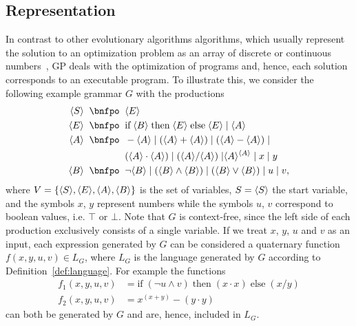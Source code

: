 \subsection{Representation}\label{sec:gggp-representation}
In contrast to other evolutionary algorithms algorithms, which usually represent the solution to an optimization problem as an array of discrete or continuous numbers~\cite{back1997handbook}, GP deals with the optimization of programs and, hence, each solution corresponds to an executable program.
To illustrate this, we consider the following example grammar $G$ with the productions
\begin{equation}
	\begin{split}
		\ps S \; \; \bnfpo & \; \; \ps E \\
		\ps E \; \; \bnfpo & \; \; \text{if} \; \ps B \; \text{then} \; \ps E \; \text{else} \; \ps E \; | \; \ps A \\
		\ps A \; \; \bnfpo & \; \; -\ps A \; | \; (\ps A + \ps A) \; | \; (\ps A - \ps A) \; | \\
		 & \; \; (\ps A \cdot \ps A) \; | \; (\ps A / \ps A) \; | \ps{A}^{\ps{A}} \; | \; x \; | \; y \\  
		\ps B \; \; \bnfpo & \; \;  \neg \ps B \; | \; (\ps B \wedge \ps B) \; | \; (\ps B \vee \ps B) \; | \; u \; | \; v,
	\end{split}
\label{eq:gp-example-grammar}
\end{equation}
where $V = \{\langle S \rangle, \langle E \rangle, \langle A \rangle, \langle B \rangle\}$ is the set of variables, $S = \langle S \rangle$ the start variable, and the symbols $x$, $y$ represent numbers while the symbols $u$, $v$ correspond to boolean values, i.e. $\top$ or $\bot$.
Note that $G$ is context-free, since the left side of each production exclusively consists of a single variable.
If we treat $x$, $y$, $u$ and $v$ as an input, each expression generated by $G$ can be considered a quaternary function $f(x,y,u,v) \in L_{G}$, where $L_G$ is the language generated by $G$ according to Definition~\ref{def:language}.
For example the functions
\begin{equation}
	\begin{split}
		f_1(x,y,u,v) & = \text{if} \; (\neg u \wedge v) \; \text{then} \; (x \cdot x) \; \text{else} \; (x / y) \\
		f_2(x,y,u,v) & = x^{(x + y)} - (y \cdot y)
	\end{split}
\label{eq:gp-example-functions}
\end{equation} can both be generated by $G$ and are, hence, included in $L_G$.
